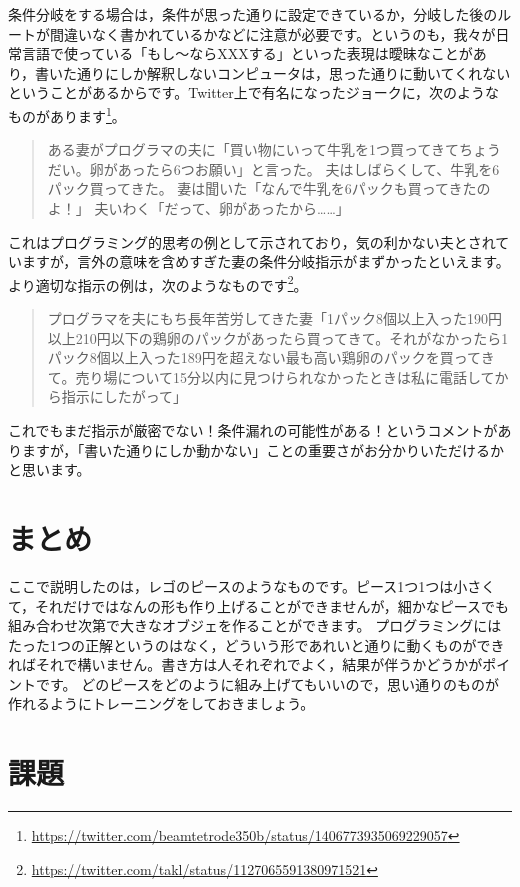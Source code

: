 \documentclass{ltjsbook}
\begin{document}
条件分岐をする場合は，条件が思った通りに設定できているか，分岐した後のルートが間違いなく書かれているかなどに注意が必要です。というのも，我々が日常言語で使っている「もし〜ならXXXする」といった表現は曖昧なことがあり，書いた通りにしか解釈しないコンピュータは，思った通りに動いてくれないということがあるからです。Twitter上で有名になったジョークに，次のようなものがあります\footnote{\url{https://twitter.com/beamtetrode350b/status/1406773935069229057}}。

\begin{quote}
	ある妻がプログラマの夫に「買い物にいって牛乳を1つ買ってきてちょうだい。卵があったら6つお願い」と言った。
	夫はしばらくして、牛乳を6パック買ってきた。
	妻は聞いた「なんで牛乳を6パックも買ってきたのよ！」
	夫いわく「だって、卵があったから……」
\end{quote}

これはプログラミング的思考の例として示されており，気の利かない夫とされていますが，言外の意味を含めすぎた妻の条件分岐指示がまずかったといえます。より適切な指示の例は，次のようなものです\footnote{\url{https://twitter.com/takl/status/1127065591380971521}}。

\begin{quote}
	プログラマを夫にもち長年苦労してきた妻「1パック8個以上入った190円以上210円以下の鶏卵のパックがあったら買ってきて。それがなかったら1パック8個以上入った189円を超えない最も高い鶏卵のパックを買ってきて。売り場について15分以内に見つけられなかったときは私に電話してから指示にしたがって」
\end{quote}

これでもまだ指示が厳密でない！条件漏れの可能性がある！というコメントがありますが，「書いた通りにしか動かない」ことの重要さがお分かりいただけるかと思います。


\section{まとめ}
ここで説明したのは，レゴのピースのようなものです。ピース1つ1つは小さくて，それだけではなんの形も作り上げることができませんが，細かなピースでも組み合わせ次第で大きなオブジェを作ることができます。
プログラミングにはたった1つの正解というのはなく，どういう形であれいと通りに動くものができればそれで構いません。書き方は人それぞれでよく，結果が伴うかどうかがポイントです。
どのピースをどのように組み上げてもいいので，思い通りのものが作れるようにトレーニングをしておきましょう。

\section{課題}
\end{document}
